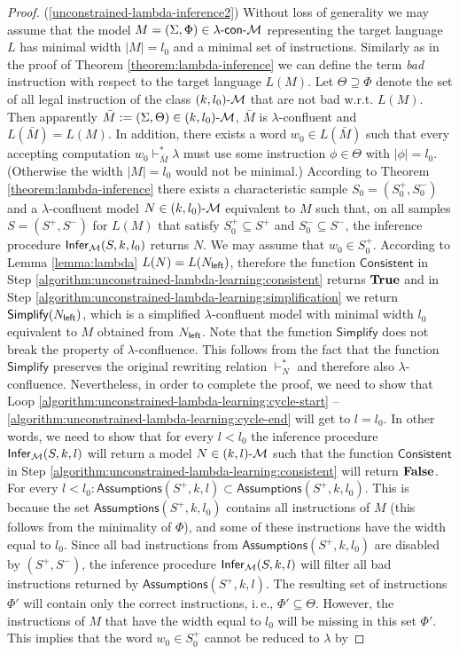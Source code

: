 \begin{proof}
\noindent(\ref{unconstrained-lambda-inference2}) Without loss of generality we may assume that the model $M = (\Sigma, \Phi) \in \textup{\sf $\lambda$-con-\textup{\sf $\mathcal{M}$}}$ representing the target language $L$ has minimal width $|M| = l_0$ and a minimal set of instructions. Similarly as in the proof of Theorem \ref{theorem:lambda-inference} we can define the term \emph{bad} instruction with respect to the target language $L(M)$. Let $\Theta \supseteq \Phi$ denote the set of all legal instruction of the class $\textup{\sf $(k,l_0)$-\textup{\sf $\mathcal{M}$}}$ that are not bad w.r.t. $L(M)$. Then apparently $\bar{M} := (\Sigma, \Theta) \in \textup{\sf $(k,l_0)$-\textup{\sf $\mathcal{M}$}}$, $\bar{M}$ is $\lambda$-confluent and $L(\bar{M}) = L(M)$. In addition, there exists a word $w_0 \in L(\bar{M})$ such that every accepting computation $w_0 \vdash_{\bar{M}}^* \lambda$ must use some instruction $\phi \in \Theta$ with $|\phi| = l_0$. (Otherwise the width $|M| = l_0$ would not be minimal.) According to Theorem \ref{theorem:lambda-inference} there exists a characteristic sample $S_0 = (S_0^+, S_0^-)$ and a $\lambda$-confluent model $N \in \textup{\sf $(k,l_0)$-\textup{\sf $\mathcal{M}$}}$ equivalent to $M$ such that, on all samples $S = (S^+, S^-)$ for $L(M)$ that satisfy $S_0^+ \subseteq S^+$ and $S_0^- \subseteq S^-$, the inference procedure $\mathsf{Infer}_{\textup{\sf $\mathcal{M}$}}(S, k, l_0)$ returns $N$. We may assume that $w_0 \in S_0^+$. According to Lemma \ref{lemma:lambda} $L(N) = L(N_{\sf left})$, therefore the function $\mathsf{Consistent}$ in Step \ref{algorithm:unconstrained-lambda-learning:consistent} returns ${\bf True}$ and in Step \ref{algorithm:unconstrained-lambda-learning:simplification} we return $\mathsf{Simplify}(N_{\sf left})$, which is a simplified $\lambda$-confluent model with minimal width $l_0$ equivalent to $M$ obtained from $N_{\sf left}$. Note that the function $\mathsf{Simplify}$ does not break the property of $\lambda$-confluence. This follows from the fact that the function $\mathsf{Simplify}$ preserves the original rewriting relation $\vdash_N^*$ and therefore also $\lambda$-confluence. Nevertheless, in order to complete the proof, we need to show that Loop \ref{algorithm:unconstrained-lambda-learning:cycle-start} -- \ref{algorithm:unconstrained-lambda-learning:cycle-end} will get to $l = l_0$. In other words, we need to show that for every $l < l_0$ the inference procedure $\mathsf{Infer}_{\textup{\sf $\mathcal{M}$}}(S, k, l)$ will return a model $N \in \textup{\sf $(k,l)$-\textup{\sf $\mathcal{M}$}}$ such that the function $\mathsf{Consistent}$ in Step \ref{algorithm:unconstrained-lambda-learning:consistent} will return ${\bf False}$. For every $l < l_0: \mathsf{Assumptions}(S^+, k, l) \subset \mathsf{Assumptions}(S^+, k, l_0)$. This is because the set $\mathsf{Assumptions}(S^+, k, l_0)$ contains all instructions of $M$ (this follows from the minimality of $\Phi$), and some of these instructions have the width equal to $l_0$. Since all bad instructions from $\mathsf{Assumptions}(S^+, k, l_0)$ are disabled by $(S^+, S^-)$, the inference procedure $\mathsf{Infer}_{\textup{\sf $\mathcal{M}$}}(S, k, l)$ will filter all bad instructions returned by $\mathsf{Assumptions}(S^+, k, l)$. The resulting set of instructions $\Phi'$ will contain only the correct instructions, i.\,e., $\Phi' \subseteq \Theta$. However, the instructions of $M$ that have the width equal to $l_0$ will be missing in this set $\Phi'$. This implies that the word $w_0 \in S_0^+$ cannot be reduced to $\lambda$ by 
\end{proof}

